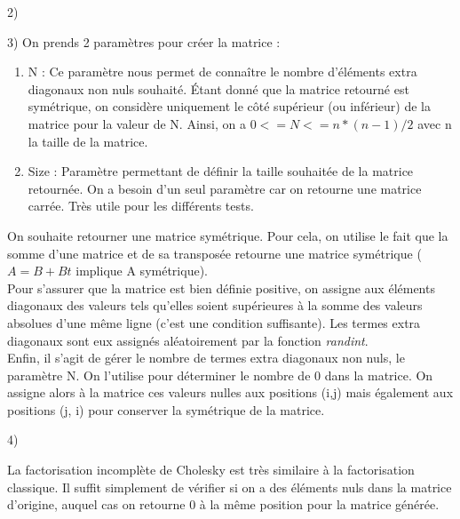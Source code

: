 \documentclass{article}
\begin{document}
    2)


    3) On prends 2 paramètres pour créer la matrice :
\begin{enumerate}
    \item N : Ce paramètre nous permet de connaître le nombre d'éléments extra diagonaux non nuls souhaité. Étant donné que la matrice retourné est symétrique, on considère uniquement le côté supérieur (ou inférieur) de la matrice pour la valeur de N. Ainsi, on a $0 <= N <= n*(n-1)/2$ avec n la taille de la matrice. \\
    
    \item Size : Paramètre permettant de définir la taille souhaitée de la matrice retournée. On a besoin d'un seul paramètre car on retourne une matrice carrée. Très utile pour les différents tests. \\
\end{enumerate}
    
On souhaite retourner une matrice symétrique. Pour cela, on utilise le fait que la somme d'une matrice et de sa transposée retourne une matrice symétrique ($A = B + Bt$ implique A symétrique). \\

Pour s'assurer que la matrice est bien définie positive, on assigne aux éléments diagonaux des valeurs tels qu'elles soient supérieures à la somme des valeurs absolues d'une même ligne (c'est une condition suffisante). Les termes extra diagonaux sont eux assignés aléatoirement par la fonction \textit{randint}. \\

Enfin, il s'agit de gérer le nombre de termes extra diagonaux non nuls, le paramètre N. On l'utilise pour déterminer le nombre de 0 dans la matrice. On assigne alors à la matrice ces valeurs nulles aux positions (i,j) mais également aux positions (j, i) pour conserver la symétrique de la matrice.
    
  4)
  
  La factorisation incomplète de Cholesky est très similaire à la factorisation classique. Il suffit simplement de vérifier si on a des éléments nuls dans la matrice d'origine, auquel cas on retourne 0 à la même position pour la matrice générée. \\
  
\end{document}
